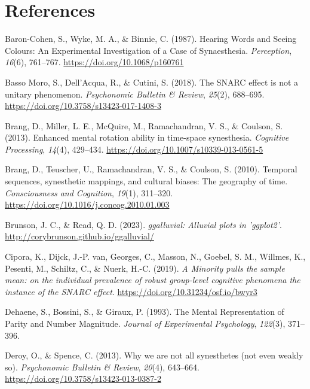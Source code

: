 \documentclass[
  man,
  floatsintext,
  longtable,
  a4paper,
  nolmodern,
  notxfonts,
  notimes,
  colorlinks=true,linkcolor=blue,citecolor=blue,urlcolor=blue]{apa7}
\newlength{\cslhangindent}
\newenvironment{CSLReferences}[2] %
 {\begin{list}{}{%
  \setlength{\itemindent}{0pt}
  \setlength{\leftmargin}{0pt}
  \setlength{\parsep}{0pt}
  \ifodd #1
   \setlength{\leftmargin}{\cslhangindent}
   \setlength{\itemindent}{-1\cslhangindent}
  \fi
  \setlength{\itemsep}{#2\baselineskip}}}
 {\end{list}}
\begin{document}
\section{References}\label{references}

\label{refs}
\begin{CSLReferences}{1}{0}
Baron-Cohen, S., Wyke, M. A., \& Binnie, C. (1987). Hearing Words and
Seeing Colours: An Experimental Investigation of a Case of Synaesthesia.
\emph{Perception}, \emph{16}(6), 761--767.
\url{https://doi.org/10.1068/p160761}

Basso Moro, S., Dell'Acqua, R., \& Cutini, S. (2018). The SNARC effect
is not a unitary phenomenon. \emph{Psychonomic Bulletin \& Review},
\emph{25}(2), 688--695. \url{https://doi.org/10.3758/s13423-017-1408-3}

Brang, D., Miller, L. E., McQuire, M., Ramachandran, V. S., \& Coulson,
S. (2013). Enhanced mental rotation ability in time-space synesthesia.
\emph{Cognitive Processing}, \emph{14}(4), 429--434.
\url{https://doi.org/10.1007/s10339-013-0561-5}

Brang, D., Teuscher, U., Ramachandran, V. S., \& Coulson, S. (2010).
Temporal sequences, synesthetic mappings, and cultural biases: The
geography of time. \emph{Consciousness and Cognition}, \emph{19}(1),
311--320. \url{https://doi.org/10.1016/j.concog.2010.01.003}

Brunson, J. C., \& Read, Q. D. (2023). \emph{{ggalluvial}: Alluvial
plots in 'ggplot2'}. \url{http://corybrunson.github.io/ggalluvial/}

Cipora, K., Dijck, J.-P. van, Georges, C., Masson, N., Goebel, S. M.,
Willmes, K., Pesenti, M., Schiltz, C., \& Nuerk, H.-C. (2019). \emph{A
Minority pulls the sample mean: on the individual prevalence of robust
group-level cognitive phenomena {\textendash} the instance of the SNARC
effect}. \url{https://doi.org/10.31234/osf.io/bwyr3}

Dehaene, S., Bossini, S., \& Giraux, P. (1993). The Mental
Representation of Parity and Number Magnitude. \emph{Journal of
Experimental Psychology}, \emph{122}(3), 371--396.

Deroy, O., \& Spence, C. (2013). Why we are not all synesthetes (not
even weakly so). \emph{Psychonomic Bulletin \& Review}, \emph{20}(4),
643--664. \url{https://doi.org/10.3758/s13423-013-0387-2}


\end{CSLReferences}
\end{document}
